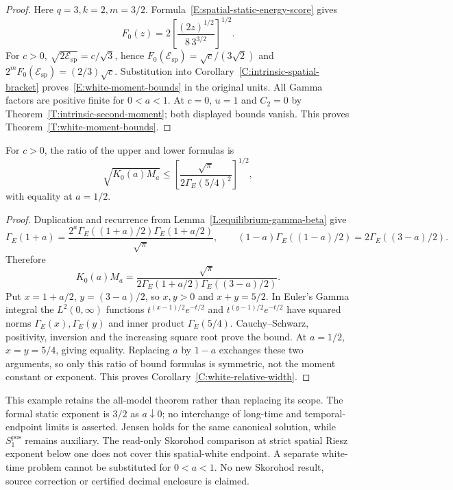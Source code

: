 \begin{proof}
  Here $q=3,k=2,m=3/2$.
  Formula~\eqref{E:spatial-static-energy-score} gives
  \[
    F_0(z)=2\left[\frac{(2z)^{1/2}}{8\,3^{3/2}}\right]^{1/2}.
  \]
  For $c>0$, $\sqrt{2\mathcal E_{\mathrm{sp}}}=c/\sqrt3$, hence
  $F_0(\mathcal E_{\mathrm{sp}})=\sqrt c/(3\sqrt2)$ and
  $2^mF_0(\mathcal E_{\mathrm{sp}})=(2/3)\sqrt c$.
  Substitution into Corollary~\ref{C:intrinsic-spatial-bracket}
  proves~\eqref{E:white-moment-bounds} in the original units.
  All Gamma factors are positive finite for $0<a<1$.
  At $c=0$, $u=1$ and $C_2=0$ by
  Theorem~\ref{T:intrinsic-second-moment}; both displayed bounds vanish.
  This proves Theorem~\ref{T:white-moment-bounds}.
\end{proof}

\begin{corollary}
  \label{C:white-relative-width}
  For $c>0$, the ratio of the upper and lower formulas is
  \[
    \sqrt{K_0(a)M_a}
    \le\left[\frac{\sqrt\pi}{2\Gamma_E(5/4)^2}\right]^{1/2},
  \]
  with equality at $a=1/2$.
\end{corollary}

\begin{proof}
  Duplication and recurrence from Lemma~\ref{L:equilibrium-gamma-beta} give
  \[
    \Gamma_E(1+a)
    =\frac{2^a\Gamma_E((1+a)/2)\Gamma_E(1+a/2)}{\sqrt\pi},
    \qquad
    (1-a)\Gamma_E((1-a)/2)=2\Gamma_E((3-a)/2).
  \]
  Therefore
  \[
    K_0(a)M_a
    =\frac{\sqrt\pi}{2\Gamma_E(1+a/2)\Gamma_E((3-a)/2)} .
  \]
  Put $x=1+a/2$, $y=(3-a)/2$, so $x,y>0$ and $x+y=5/2$.
  In Euler's Gamma integral the $L^2(0,\infty)$ functions
  $t^{(x-1)/2}e^{-t/2}$ and $t^{(y-1)/2}e^{-t/2}$
  have squared norms $\Gamma_E(x),\Gamma_E(y)$ and inner product
  $\Gamma_E(5/4)$.
  Cauchy--Schwarz, positivity, inversion and the increasing square root
  prove the bound. At $a=1/2$, $x=y=5/4$, giving equality.
  Replacing $a$ by $1-a$ exchanges these two arguments, so only this
  ratio of bound formulas is symmetric, not the moment constant or exponent.
  This proves Corollary~\ref{C:white-relative-width}.
\end{proof}

This example retains the all-model theorem rather than replacing its scope.
The formal static exponent is $3/2$ as $a\downarrow0$; no interchange
of long-time and temporal-endpoint limits is asserted.
Jensen holds for the same canonical solution, while $S_1^{\mathrm{pos}}$
remains auxiliary.
The read-only Skorohod comparison at strict spatial Riesz exponent below
one does not cover this spatial-white endpoint.
A separate white-time problem cannot be substituted for $0<a<1$.
No new Skorohod result, source correction or certified decimal enclosure
is claimed.
